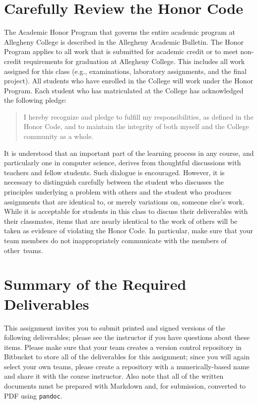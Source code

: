 \section*{Carefully Review the Honor Code}

The Academic Honor Program that governs the entire academic program at Allegheny College is described in the Allegheny
Academic Bulletin.  The Honor Program applies to all work that is submitted for academic credit or to meet non-credit
requirements for graduation at Allegheny College.  This includes all work assigned for this class (e.g., examinations,
  laboratory assignments, and the final project).  All students who have enrolled in the College will work under the Honor
Program.  Each student who has matriculated at the College has acknowledged the following pledge:

\vspace*{-.05in}
\begin{quote}
  I hereby recognize and pledge to fulfill my responsibilities, as defined in the Honor Code, and to maintain the
  integrity of both myself and the College community as a whole.
\end{quote}
\vspace*{-.05in}

\noindent It is understood that an important part of the learning process in any course, and particularly one in
computer science, derives from thoughtful discussions with teachers and fellow students.  Such dialogue is encouraged.
However, it is necessary to distinguish carefully between the student who discusses the principles underlying a problem
with others and the student who produces assignments that are identical to, or merely variations on, someone else's
work.  While it is acceptable for students in this class to discuss their deliverables with their classmates, items that
are nearly identical to the work of others will be taken as evidence of violating the Honor Code. In particular, make
sure that your team members do not inappropriately communicate with the members of \mbox{other teams}.


\section*{Summary of the Required Deliverables}

This assignment invites you to submit printed and signed versions of the following deliverables; please see the
instructor if you have questions about these items. Please make sure that your team creates a version control repository
in Bitbucket to store all of the deliverables for this assignment; since you will again select your own teams, please
create a repository with a numerically-based name and share it with the course instructor. Also note that all of the
written documents must be prepared with Markdown and, for submission, converted to PDF using {\tt pandoc}.

